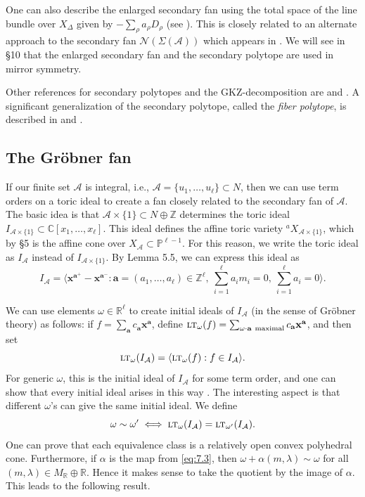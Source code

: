 \documentclass{amsart}
\theoremstyle{plain}
\theoremstyle{definition}
\begin{document}
	One can also describe the enlarged secondary fan using the
total space of the line bundle over $X_\Delta$ given by $-\sum_\rho
a_\rho D_\rho$ (see \cite{AGM2}).  This is closely related to an
alternate approach to the secondary fan $\mathcal{N}(\Sigma(\mathcal{A}))$
which appears in \cite{OP}.  We will see in \S10 that the
enlarged secondary fan and the secondary polytope are used in mirror
symmetry.  

	Other references for secondary polytopes and the
GKZ-decomposition are \cite{Loe} and \cite{Par}.  A significant
generalization of the secondary polytope, called the {\it fiber
polytope\/}, is described in \cite{BS} and \cite{Zie}.
	
	\subsection{The Gr\"obner fan} If our finite set
$\mathcal{A}$ is integral, i.e., $\mathcal{A} = \{u_1,\ldots,u_\ell\} \subset
N$, then we can use term orders on a toric ideal to create a fan
closely related to the secondary fan of $\mathcal{A}$.  The basic idea is
that $\mathcal{A}\times\{1\} \subset N\oplus\mathbb{Z}$ determines the toric
ideal $I_{\mathcal{A}\times\{1\}} \subset \mathbb{C}[x_1,\dots,x_\ell]$.
This ideal defines the affine toric variety
${}^a\!X_{\mathcal{A}\times\{1\}}$, which by \S5 is the affine cone over
$X_{\mathcal{A}} \subset \mathbb{P}^{\ell-1}$.  For this reason, we write
the toric ideal as $I_{\mathcal{A}}$ instead of $I_{\mathcal{A}\times\{1\}}$.
By Lemma 5.5, we can express this ideal as
\begin{equation}
I_{\mathcal{A}} = \langle \mathbf{x}^{\mathbf{a}^+} -
\mathbf{x}^{\mathbf{a}^-} : \mathbf{a} = (a_1,\dots,a_\ell) \in \mathbb{Z}^\ell,\ {\textstyle{\sum_{i=1}^\ell}} a_im_i = 0,\
{\textstyle{\sum_{i=1}^\ell}} a_i= 0\rangle.
\tag{7.5}\label{eq:7.5}
\end{equation}

	We can use elements $\omega \in \mathbb{R}^\ell$ to create
initial ideals of $I_{\mathcal{A}}$ (in the sense of Gr\"obner theory) as
follows: if $f = \sum_{\mathbf{a}} c_{\mathbf{a}} \mathbf{x}^{\mathbf{a}}$,
define $\text{\textsc{lt}}_\omega(f) = \sum_{\omega\cdot\mathbf{a}\
\mathrm{maximal}} c_{\mathbf{a}} \mathbf{x}^{\mathbf{a}}$, and then set
\[
\text{\textsc{lt}}_\omega(I_{\mathcal{A}}) = \langle \text{\textsc{lt}}_\omega(f) : f \in I_{\mathcal{A}}\rangle.
\]
For generic $\omega$, this is the initial ideal of $I_{\mathcal{A}}$ for
some term order, and one can show that every initial ideal arises in
this way \cite{Stu2}.  The interesting aspect is that different
$\omega$'s can give the same initial ideal.  We define
\[
\omega \sim \omega' \iff \text{\textsc{lt}}_\omega(I_{\mathcal{A}}) = \text{\textsc{lt}}_{\omega'}(I_{\mathcal{A}}).
\]
One can prove that each equivalence class is a relatively open convex
polyhedral cone.  Furthermore, if $\alpha$ is the map from
\eqref{eq:7.3}, then $\omega + \alpha(m,\lambda) \sim \omega$ for all
$(m,\lambda) \in M_\mathbb{R}\oplus\mathbb{R}$.  Hence it makes sense to
take the quotient by the image of $\alpha$.  This leads to the
following result.
\end{document}
